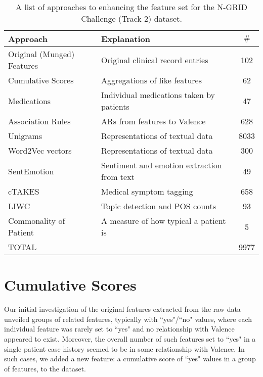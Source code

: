\begin{table}[t]
 \centering
 \begin{tabular}{|l|l|c|}
    \hline
    \textsf{Approach}  & \textsf{Explanation} & $\#$  \\
    \hline
      \textsf{Original (Munged) Features}& Original clinical record entries & 102 \\
\hline
      \textsf{Cumulative Scores}& Aggregations of like features & 62 \\ 
      \textsf{Medications} & Individual medications taken by patients & 47 \\ %
           
      \textsf{Association Rules} & ARs from features to \textsf{Valence}& 628\\
     
      \textsf{Unigrams} & Representations of textual data  & 8033 \\ 
      \textsf{Word2Vec vectors}& Representations of textual data & 300 \\
      \textsf{SentEmotion} & Sentiment and emotion extraction from text & 49 \\
      \textsf{cTAKES} & Medical symptom tagging & 658 \\
      \textsf{LIWC} & Topic detection and POS counts & 93 \\ 
      \textsf{Commonality of Patient} & A measure of how typical a patient is & 5 \\
      \hline
      \textsf{TOTAL} & & 9977\\
      \hline
 \end{tabular}
 \caption{A list of approaches to enhancing the feature set for the N-GRID Challenge (Track 2) dataset.}
 \label{tab:features}
\end{table}
 
 
 \section{Cumulative Scores}  Our initial investigation of the original 
 features extracted from the raw data unveiled groups of related features, typically
 with ``yes"/``no" values, where each individual feature was rarely set to ``yes" and no relationship with \textsf{Valence} appeared to exist. Moreover,
 the overall number of such features set to ``yes" in a single patient case history seemed to be in some relationship with \textsf{Valence}.  In such cases, we added a new feature: a
 \textsf{cumulative score} of ``yes" values in a group of features, to the dataset.
 
